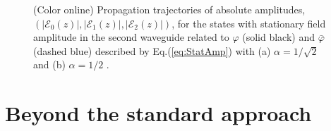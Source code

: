 \documentclass[9pt,twocolumn,twoside]{osajnl}
\begin{document}
\begin{figure}[htbp]
	\centering
	\caption{(Color online) Propagation trajectories of absolute amplitudes, $(\vert \mathcal{E}_{0}(z) \vert, \vert \mathcal{E}_{1}(z) \vert, \vert \mathcal{E}_{2}(z) \vert )$,  for the states with stationary field amplitude in the second waveguide related to $\varphi$ (solid black) and $\bar{\varphi}$ (dashed blue) described by Eq.(\ref{eq:StatAmp}) with (a) $\alpha = 1 / \sqrt{2}$ and (b) $\alpha = 1 / 2$ .}
	\label{fig:Fig5}
\end{figure}




\section{Beyond the standard approach}
\end{document}
